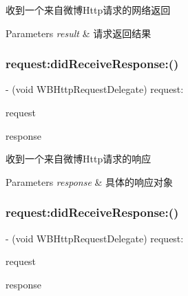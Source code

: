 收到一个来自微博\+Http请求的网络返回


\begin{DoxyParams}{Parameters}
{\em result} & 请求返回结果 \\
\hline
\end{DoxyParams}
\mbox{\label{protocol_w_b_http_request_delegate_01-p_af9e98d40b55162297757fc2e27d0513e}} 
\subsubsection{\texorpdfstring{request\+:did\+Receive\+Response\+:()}{request:didReceiveResponse:()}\hspace{0.1cm}{\footnotesize\ttfamily [1/3]}}
{\footnotesize\ttfamily -\/ (void W\+B\+Http\+Request\+Delegate) request\+: \begin{DoxyParamCaption}\item[{(\mbox{\hyperlink{interface_w_b_http_request}{W\+B\+Http\+Request}} $\ast$)}]{request }\item[{didReceiveResponse:(N\+S\+U\+R\+L\+Response $\ast$)}]{response }\end{DoxyParamCaption}\hspace{0.3cm}{\ttfamily [optional]}}

收到一个来自微博\+Http请求的响应


\begin{DoxyParams}{Parameters}
{\em response} & 具体的响应对象 \\
\hline
\end{DoxyParams}
\mbox{\label{protocol_w_b_http_request_delegate_01-p_af9e98d40b55162297757fc2e27d0513e}} 
\subsubsection{\texorpdfstring{request\+:did\+Receive\+Response\+:()}{request:didReceiveResponse:()}\hspace{0.1cm}{\footnotesize\ttfamily [2/3]}}
{\footnotesize\ttfamily -\/ (void W\+B\+Http\+Request\+Delegate) request\+: \begin{DoxyParamCaption}\item[{(\mbox{\hyperlink{interface_w_b_http_request}{W\+B\+Http\+Request}} $\ast$)}]{request }\item[{didReceiveResponse:(N\+S\+U\+R\+L\+Response $\ast$)}]{response }\end{DoxyParamCaption}\hspace{0.3cm}{\ttfamily [optional]}}


